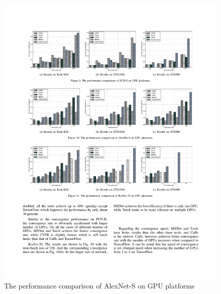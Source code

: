 \documentclass[11pt, oneside]{article}   	%
\begin{document}
\begin{figure}[htbp] 
	\includegraphics[width=\linewidth]{figures/AlexNet-S2.pdf} 
	\caption{The performance comparison of AlexNet-S on GPU platforms}
\end{figure}
%
\end{document}

